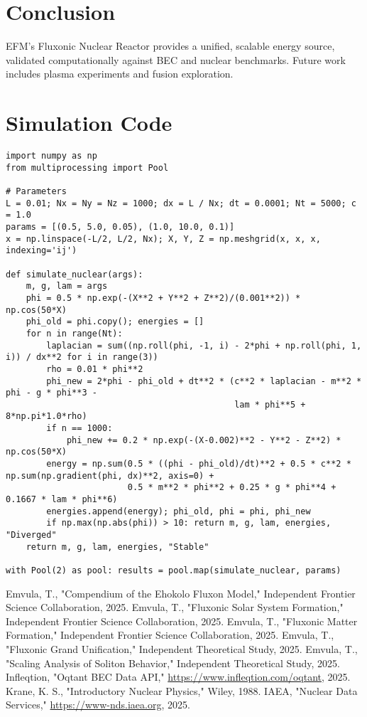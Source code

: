 \documentclass[11pt]{article}
\begin{document}
\section{Conclusion}
EFM’s Fluxonic Nuclear Reactor provides a unified, scalable energy source, validated computationally against BEC and nuclear benchmarks. Future work includes plasma experiments and fusion exploration.

\appendix
\section{Simulation Code}
\lstset{language=Python, basicstyle=\footnotesize\ttfamily, breaklines=true, numbers=left}
\begin{lstlisting}
import numpy as np
from multiprocessing import Pool

# Parameters
L = 0.01; Nx = Ny = Nz = 1000; dx = L / Nx; dt = 0.0001; Nt = 5000; c = 1.0
params = [(0.5, 5.0, 0.05), (1.0, 10.0, 0.1)]
x = np.linspace(-L/2, L/2, Nx); X, Y, Z = np.meshgrid(x, x, x, indexing='ij')

def simulate_nuclear(args):
    m, g, lam = args
    phi = 0.5 * np.exp(-(X**2 + Y**2 + Z**2)/(0.001**2)) * np.cos(50*X)
    phi_old = phi.copy(); energies = []
    for n in range(Nt):
        laplacian = sum((np.roll(phi, -1, i) - 2*phi + np.roll(phi, 1, i)) / dx**2 for i in range(3))
        rho = 0.01 * phi**2
        phi_new = 2*phi - phi_old + dt**2 * (c**2 * laplacian - m**2 * phi - g * phi**3 - 
                                             lam * phi**5 + 8*np.pi*1.0*rho)
        if n == 1000:
            phi_new += 0.2 * np.exp(-(X-0.002)**2 - Y**2 - Z**2) * np.cos(50*X)
        energy = np.sum(0.5 * ((phi - phi_old)/dt)**2 + 0.5 * c**2 * np.sum(np.gradient(phi, dx)**2, axis=0) + 
                        0.5 * m**2 * phi**2 + 0.25 * g * phi**4 + 0.1667 * lam * phi**6)
        energies.append(energy); phi_old, phi = phi, phi_new
        if np.max(np.abs(phi)) > 10: return m, g, lam, energies, "Diverged"
    return m, g, lam, energies, "Stable"

with Pool(2) as pool: results = pool.map(simulate_nuclear, params)
\end{lstlisting}




\begin{thebibliography}{9}
Emvula, T., "Compendium of the Ehokolo Fluxon Model," Independent Frontier Science Collaboration, 2025.
Emvula, T., "Fluxonic Solar System Formation," Independent Frontier Science Collaboration, 2025.
Emvula, T., "Fluxonic Matter Formation," Independent Frontier Science Collaboration, 2025.
Emvula, T., "Fluxonic Grand Unification," Independent Theoretical Study, 2025.
Emvula, T., "Scaling Analysis of Soliton Behavior," Independent Theoretical Study, 2025.
Infleqtion, "Oqtant BEC Data API," \url{https://www.infleqtion.com/oqtant}, 2025.
Krane, K. S., "Introductory Nuclear Physics," Wiley, 1988.
IAEA, "Nuclear Data Services," \url{https://www-nds.iaea.org}, 2025.
\end{thebibliography}
\end{document}
